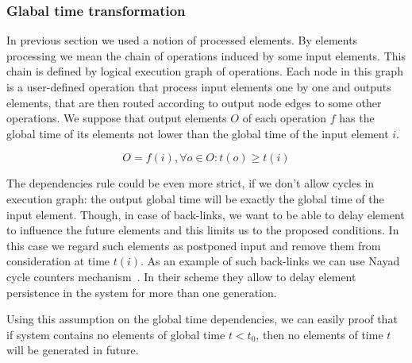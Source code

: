 
\subsubsection{Glabal time transformation}

In previous section we used a notion of processed elements. By elements processing we mean the chain of operations induced by some input elements. This chain is defined by logical execution graph of operations. Each node in this graph is a user-defined operation that process input elements one by one and outputs elements, that are then routed according to output node edges to some other operations. We suppose that output elements $O$ of each operation $f$ has the global time of its elements not lower than the global time of the input element $i$.

\begin{equation}
    O = f(i), \forall o \in O: t(o) \ge t(i)
\end{equation}

The dependencies rule could be even more strict, if we don't allow cycles in execution graph: the output global time will be exactly the global time of the input element. Though, in case of back-links, we want to be able to delay element to influence the future elements and this limits us to the proposed conditions. In this case we regard such elements as postponed input and remove them from consideration at time $t(i)$. As an example of such back-links we can use Nayad cycle counters mechanism~\cite{Murray:2013:NTD:2517349.2522738}. In their scheme they allow to delay element persistence in the system for more than one generation.

Using this assumption on the global time dependencies, we can easily proof that if system contains no elements of global time $t < t_0$, then no elements of time $t$ will be generated in future.


